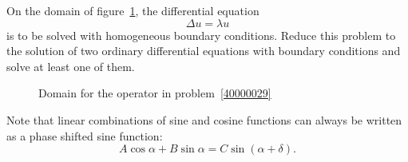 On the domain of figure~\ref{40000029:domain}, the differential equation
\begin{equation}
\Delta u = \lambda u
\label{40000029:evproblem}
\end{equation}
is to be solved with homogeneous boundary conditions.
Reduce this problem to the solution of two ordinary differential equations
with boundary conditions and solve at least one of them.
\begin{figure}[ht]
\centering
{}
\caption{Domain for the operator in problem~\ref{40000029}
\label{40000029:domain}}
\end{figure}

\begin{hinweis}
Note that linear combinations of sine and cosine functions can
always be written as a phase shifted sine function:
\[
A\cos \alpha + B \sin \alpha =  C \sin(\alpha+\delta).
\]
\end{hinweis}

